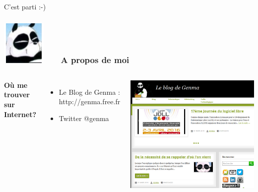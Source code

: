 \documentclass{beamer}
\begin{document}
\begin{frame}
\begin{center}
\Huge {C'est parti :-)}
\end{center}
\end{frame}

\begin{frame}
\frametitle{\includegraphics[scale=0.4]{./images/Genma.jpg} \ \ \  A propos de moi  }
\begin{columns}[c] 
\textbf{Où me trouver sur Internet?}
\begin{itemize}
\item Le Blog de Genma : http://genma.free.fr
\item Twitter @genma
\end{itemize}
\includegraphics[scale=0.4] {./images/blog.png} 
\end{columns}
\end{frame}
\end{document}
